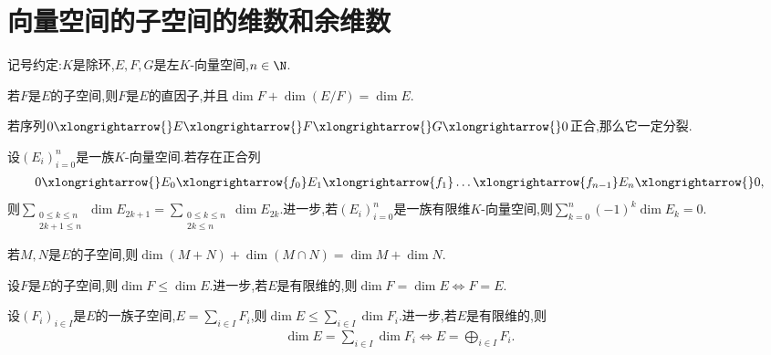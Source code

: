 \section{向量空间的子空间的维数和余维数}

记号约定:$K$是除环,$E,F,G$是左$K$-向量空间,$n\in\N$.

\begin{proposition}{}{}
	若$F$是$E$的子空间,则$F$是$E$的直因子,并且$\dim F+\dim \left(E/F\right)=\dim E$.
\end{proposition}

\begin{corollary}{}{}
	若序列$0\xlongrightarrow{}E\xlongrightarrow{}F\xlongrightarrow{}G\xlongrightarrow{}0$正合,那么它一定分裂.
\end{corollary}

\begin{corollary}{}{}
	设$\left(E_{i}\right)_{i=0}^{n}$是一族$K$-向量空间.若存在正合列
	\begin{align*}
		0\xlongrightarrow{}E_{0}\xlongrightarrow{f_{0}}E_{1}\xlongrightarrow{f_{1}}\ldots\xlongrightarrow{f_{n-1}}E_{n}\xlongrightarrow{}0,
	\end{align*}
	则$\sum\limits_{\substack{0\leq k\leq n\\2k+1\leq n}}\dim E_{2k+1}=\sum\limits_{\substack{0\leq k\leq n\\2k\leq n}}\dim E_{2k}$.进一步,若$\left(E_{i}\right)_{i=0}^{n}$是一族有限维$K$-向量空间,则$\sum\limits_{k=0}^{n}\left(-1\right)^{k}\dim E_{k}=0.$
\end{corollary}

\begin{corollary}{}{}
	若$M,N$是$E$的子空间,则$\dim\left(M+N\right)+\dim\left(M\cap N\right)=\dim M+\dim N$.
\end{corollary}

\begin{corollary}{}{}
	设$F$是$E$的子空间,则$\dim F\leq\dim E$.进一步,若$E$是有限维的,则$\dim F=\dim E\iff F=E$.
\end{corollary}

\begin{corollary}{}{}
	设$\left(F_{i}\right)_{i\in I}$是$E$的一族子空间,$E=\sum\limits_{i\in I}F_{i}$,则$\dim E\leq\sum\limits_{i\in I}\dim F_{i}$.进一步,若$E$是有限维的,则
	\begin{align*}
		\dim E=\sum\limits_{i\in I}\dim F_{i}\iff E=\bigoplus\limits_{i\in I}F_{i}.
	\end{align*}
\end{corollary}

